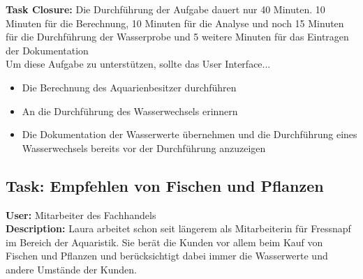 \textbf{Task Closure:} Die Durchführung der Aufgabe dauert nur 40 Minuten. 10 Minuten für die Berechnung, 10 Minuten für die Analyse und noch 15 Minuten für die Durchführung der Wasserprobe und 5 weitere Minuten für das Eintragen der Dokumentation\\

Um diese Aufgabe zu unterstützen, sollte das User Interface...
\begin{itemize}
  \item Die Berechnung des Aquarienbesitzer durchführen
  \item An die Durchführung des Wasserwechsels erinnern
  \item Die Dokumentation der Wasserwerte übernehmen und die Durchführung eines Wasserwechsels bereits vor der Durchführung anzuzeigen
\end{itemize}


\subsection{\textbf{Task:} Empfehlen von Fischen und Pflanzen	}
\textbf{User:} Mitarbeiter des Fachhandels\\

\textbf{Description:} Laura arbeitet schon seit längerem als Mitarbeiterin für Fressnapf im Bereich der Aquaristik. Sie berät die Kunden vor allem beim Kauf von Fischen und Pflanzen und berücksichtigt dabei immer die Wasserwerte und andere Umstände der Kunden.\\

